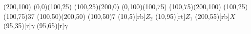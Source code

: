 \begin{axopicture}(200,100)
	\Line[arrow](0,0)(100,25)
	\Line[arrow](100,25)(200,0)
	\Line[arrow](0,100)(100,75)
	\Line[arrow](100,75)(200,100)
	\Photon(100,25)(100,75){3}{7}
	(100,50)(200,50)
	\BCirc(100,50){7}
	\Text(10,5)[rb]{$Z_2$}
	\Text(10,95)[rt]{$Z_1$}
	\Text(200,55)[rb]{$X$}
	\Text(95,35)[r]{$\gamma$}
	\Text(95,65)[r]{$\gamma$}
\end{axopicture}

